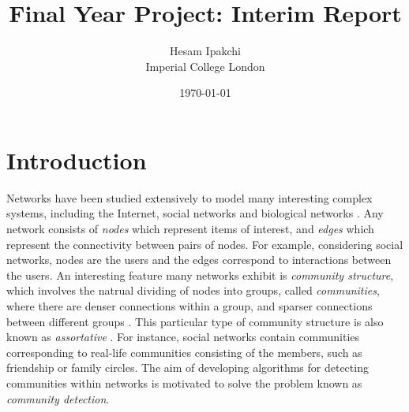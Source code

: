 \documentclass[12pt]{article}
\numberwithin{equation}{section}
\begin{document}
\nocite{*}


\title{\textbf{Final Year Project: Interim Report}}
\author{Hesam Ipakchi\\Imperial College London}
\date{\today}
\maketitle


\newpage
\thispagestyle{plain}
\mbox{}
\tableofcontents


\newpage
\thispagestyle{plain}
\mbox{}
\listoffigures


\newpage
\thispagestyle{plain}
\mbox{}
\section {Introduction}
\label{sec:introduction}

Networks have been studied extensively to model many interesting complex systems, including the Internet, social networks and biological networks \cite{New06a,DKM+13}. Any network consists of \textit{nodes} which represent items of interest, and \textit{edges} which represent the connectivity between pairs of nodes. For example, considering social networks, nodes are the users and the edges correspond to interactions between the users. An interesting feature many networks exhibit is \textit{community structure}, which involves the natrual dividing of nodes into groups, called \textit{communities}, where there are denser connections within a group, and sparser connections between different groups \cite{New06a,DKM+13,For10,New06b}. This particular type of community structure is also known as \textit{assortative} \cite{DKM+13}. For instance, social networks contain communities corresponding to real-life communities consisting of the members, such as friendship or family circles. The aim of developing algorithms for detecting communities within networks is motivated to solve the problem known as \textit{community detection}.
\end{document}
